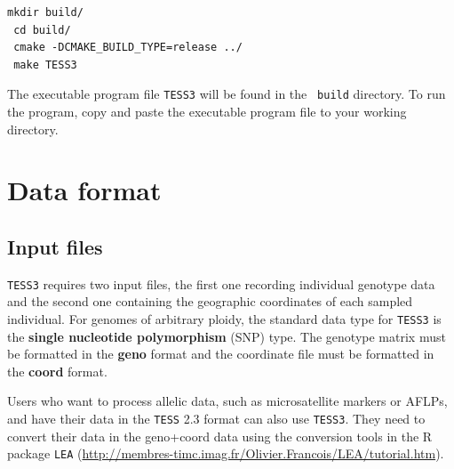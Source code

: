 \documentclass[12pt,a4paper]{article}
\begin{document}
\begin{Verbatim}[frame = single]
 mkdir build/
 cd build/
 cmake -DCMAKE_BUILD_TYPE=release ../
 make TESS3
\end{Verbatim}

 \noindent The executable program file {\tt TESS3} will be found in the {\tt 
build} directory. To run the program, copy and paste the executable program file to your working directory.
 
\section{Data format}

\subsection{Input files}

{\tt TESS3} requires two input files, the first one recording individual 
genotype data and the second one containing the geographic coordinates of  each 
sampled individual. For genomes of arbitrary ploidy, the standard data 
type for {\tt TESS3} is the {\bf single nucleotide polymorphism} (SNP) type.  
The genotype matrix must be formatted in the {\bf geno} format and the 
coordinate file must be formatted in the {\bf coord} format.

Users who want to process allelic data, such as microsatellite markers or AFLPs, 
and have their data in the {\tt TESS} 2.3 format can also use {\tt TESS3}. They 
need to convert their data in the geno+coord data using the conversion tools in the R package
{\tt LEA} (\url{http://membres-timc.imag.fr/Olivier.Francois/LEA/tutorial.htm}).
\end{document}
